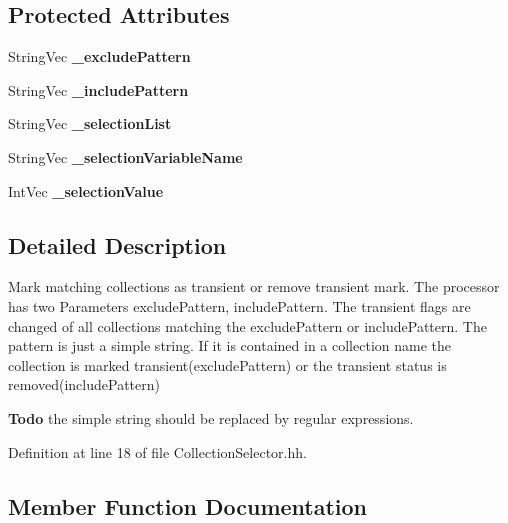 \subsection*{Protected Attributes}
\begin{DoxyCompactItemize}
\item 
StringVec {\bfseries \_\-excludePattern}\label{classCALICE_1_1CollectionSelector_a86b479c6f8e185649ad9abd60f7368f6}

\item 
StringVec {\bfseries \_\-includePattern}\label{classCALICE_1_1CollectionSelector_affaaa3265a0d7999c529145d548b4acb}

\item 
StringVec {\bfseries \_\-selectionList}\label{classCALICE_1_1CollectionSelector_a256b9ed4988d50f352080713f747eb48}

\item 
StringVec {\bfseries \_\-selectionVariableName}\label{classCALICE_1_1CollectionSelector_a312bf14ff28957ec68c3155065a7aae4}

\item 
IntVec {\bfseries \_\-selectionValue}\label{classCALICE_1_1CollectionSelector_a924046461ef2a59eebafcc04184f6069}

\end{DoxyCompactItemize}


\subsection{Detailed Description}
Mark matching collections as transient or remove transient mark. The processor has two Parameters excludePattern, includePattern. The transient flags are changed of all collections matching the excludePattern or includePattern. The pattern is just a simple string. If it is contained in a collection name the collection is marked transient(excludePattern) or the transient status is removed(includePattern) \begin{Desc}
\item[{\bf Todo}]the simple string should be replaced by regular expressions. \end{Desc}


Definition at line 18 of file CollectionSelector.hh.

\subsection{Member Function Documentation}
